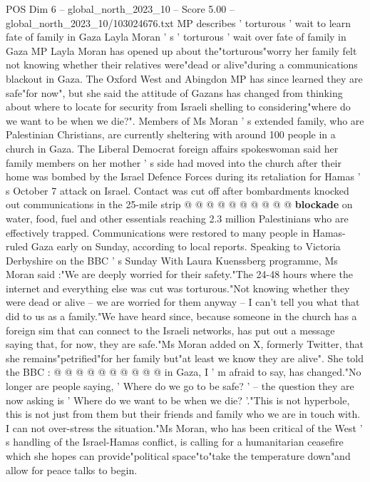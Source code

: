 \begin{textsample}{POS Dim 6 – global\_north\_2023\_10 – Score 5.00 – global\_north\_2023\_10/103024676.txt}  \label{ex:f6_pos_242}
MP describes ' torturous ' wait to learn fate of family in Gaza Layla Moran ' s ' torturous ' wait over fate of family in Gaza MP Layla Moran has opened up about the"torturous"worry her family felt not knowing whether their relatives were"dead or alive"during a communications blackout in Gaza.
The Oxford West and Abingdon MP has since learned they are safe"for now", but she said the attitude of Gazans has changed from thinking about where to locate for security from Israeli shelling to considering"where do we want to be when we die?".
Members of Ms Moran ' s extended family, who are Palestinian Christians, are currently sheltering with around 100 people in a church in Gaza.
The Liberal Democrat foreign affairs spokeswoman said her family members on her mother ' s side had moved into the church after their home was bombed by the Israel Defence Forces during its retaliation for Hamas ' s October 7 attack on Israel.
Contact was cut off after bombardments knocked out communications in the 25-mile strip @ @ @ @ @ @ @ @ @ @ \textbf{blockade} on water, food, fuel and other essentials reaching 2.3 million Palestinians who are effectively trapped.
Communications were restored to many people in Hamas-ruled Gaza early on Sunday, according to local reports.
Speaking to Victoria Derbyshire on the BBC ' s Sunday With Laura Kuenssberg programme, Ms Moran said :"We are deeply worried for their safety."The 24-48 hours where the internet and everything else was cut was torturous."Not knowing whether they were dead or alive -- we are worried for them anyway -- I can't tell you what that did to us as a family."We have heard since, because someone in the church has a foreign sim that can connect to the Israeli networks, has put out a message saying that, for now, they are safe."Ms Moran added on X, formerly Twitter, that she remains"petrified"for her family but"at least we know they are alive".
She told the BBC : @ @ @ @ @ @ @ @ @ @ in Gaza, I ' m afraid to say, has changed."No longer are people saying, ' Where do we go to be safe? ' -- the question they are now asking is ' Where do we want to be when we die? '."This is not hyperbole, this is not just from them but their friends and family who we are in touch with.
I can not over-stress the situation."Ms Moran, who has been critical of the West ' s handling of the Israel-Hamas conflict, is calling for a humanitarian ceasefire which she hopes can provide"political space"to"take the temperature down"and allow for peace talks to begin.

\end{textsample}
